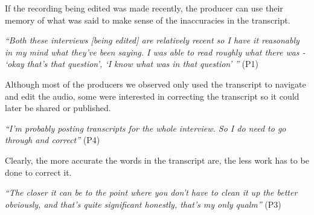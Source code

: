 If the recording being edited was made recently, the producer can use their
memory of what was said to make sense of the inaccuracies in the
transcript.

\textit{``Both these interviews [being edited] are relatively recent so I have
  it reasonably in my mind what they've been saying. I was able to read roughly
  what there was - `okay that's that question', `I know what was in that
  question' ''} (P1)

Although most of the producers we observed only used the transcript to navigate
and edit the audio, some were interested in correcting the transcript so it
could later be shared or published.

\textit{``I'm probably posting transcripts for the whole interview. So I do
  need to go through and correct''} (P4)

Clearly, the more accurate the words in the transcript are, the less work has
to be done to correct it.

\textit{``The closer it can be to the point where you don't have to clean it up
  the better obviously, and that's quite significant honestly, that's my only
  qualm''} (P3)









